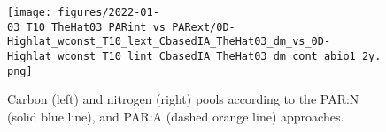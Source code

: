 \documentclass[gmd, manuscript]{copernicus}
\begin{document}
\begin{figure}[ht!]
\texttt{[image: figures/2022-01-03\_T10\_TheHat03\_PARint\_vs\_PARext/0D-Highlat\_wconst\_T10\_lext\_CbasedIA\_TheHat03\_dm\_vs\_0D-Highlat\_wconst\_T10\_lint\_CbasedIA\_TheHat03\_dm\_cont\_abio1\_2y.png]}
\caption{Carbon (left) and nitrogen (right) pools according to the PAR:N (solid blue line), and PAR:A (dashed orange line) approaches. \label{f.CNvars}}
\end{figure}















\end{document}
